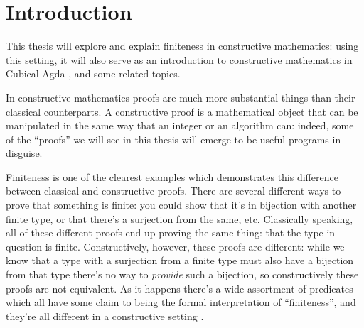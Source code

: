\chapter{Introduction}




This thesis will explore and explain finiteness in constructive
mathematics: using this setting, it will also serve as an introduction to
constructive mathematics in Cubical Agda
\cite{vezzosiCubicalAgdaDependently2019}, and some related topics.

In constructive mathematics proofs are much more substantial things than their
classical counterparts.
A constructive proof is a mathematical object that can be manipulated in the
same way that an integer or an algorithm can: indeed, some of the ``proofs'' we
will see in this thesis will emerge to be useful programs in disguise.

Finiteness is one of the clearest examples which demonstrates this difference
between classical and constructive proofs.
There are several different ways to prove that something is finite: you could
show that it's in bijection with another finite type, or that there's a
surjection from the same, etc.
Classically speaking, all of these different proofs end up proving the same
thing: that the type in question is finite.
Constructively, however, these proofs are different: while we know that a type
with a surjection from a finite type must also have a bijection from that type
there's no way to \emph{provide} such a bijection, so constructively these
proofs are not equivalent.
As it happens there's a wide assortment of predicates which all have some claim
to being the formal interpretation of ``finiteness'', and they're all different
in a constructive setting \cite{coquandConstructivelyFinite2010}.

